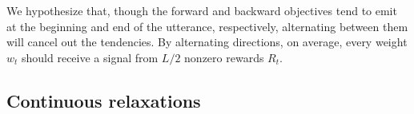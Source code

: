 \documentclass{article}
\begin{document}
We hypothesize that, though the forward and backward objectives tend to emit at
the beginning and end of the utterance, respectively, alternating between them
will cancel out the tendencies. By alternating directions, on average, every
weight $w_t$ should receive a signal from $L / 2$ nonzero rewards $R_t$.

\subsection{Continuous relaxations} \label{sec:relaxations}



\end{document}
